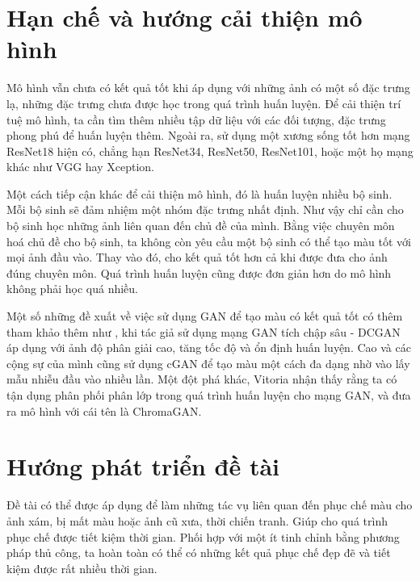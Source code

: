 \documentclass[a4paper, 12pt]{report}
\begin{document}
\section{Hạn chế và hướng cải thiện mô hình}\label{enhancemodel}

Mô hình vẫn chưa có kết quả tốt khi áp dụng với những ảnh có một số đặc trưng lạ, những đặc trưng chưa được học trong quá trình huấn luyện.
Để cải thiện trí tuệ mô hình, ta cần tìm thêm nhiều tập dữ liệu với các đối tượng, đặc trưng phong phú để huấn luyện thêm.
Ngoài ra, sử dụng một xương sống tốt hơn mạng ResNet18 hiện có, chẳng hạn ResNet34, ResNet50, ResNet101, hoặc một họ mạng khác như VGG hay Xception.\vspace{5pt}

Một cách tiếp cận khác để cải thiện mô hình, đó là huấn luyện nhiều bộ sinh.
Mỗi bộ sinh sẽ đảm nhiệm một nhóm đặc trưng nhất định.
Như vậy chỉ cần cho bộ sinh học những ảnh liên quan đến chủ đề của mình.
Bằng việc chuyên môn hoá chủ đề cho bộ sinh, ta không còn yêu cầu một bộ sinh có thể tạo màu tốt với mọi ảnh đầu vào.
Thay vào đó, cho kết quả tốt hơn cả khi được đưa cho ảnh đúng chuyên môn.
Quá trình huấn luyện cũng được đơn giản hơn do mô hình không phải học quá nhiều.\vspace{5pt}

Một số những đề xuất về việc sử dụng GAN để tạo màu có kết quả tốt có thêm tham khảo thêm như \cite{Nazeri_2018}, khi tác giả sử dụng mạng GAN tích chập sâu - DCGAN áp dụng với ảnh độ phân giải cao, tăng tốc độ và ổn định huấn luyện.
Cao và các cộng sự của mình \cite{cao2017unsupervised} cũng sử dụng cGAN để tạo màu một cách đa dạng nhờ vào lấy mẫu nhiễu đầu vào nhiều lần.
Một đột phá khác, Vitoria \cite{vitoria2020chromagan} nhận thấy rằng ta có tận dụng phân phối phân lớp trong quá trình huấn luyện cho mạng GAN, và đưa ra mô hình với cái tên là ChromaGAN.

\section{Hướng phát triển đề tài}

Đề tài có thể được áp dụng để làm những tác vụ liên quan đến phục chế màu cho ảnh xám, bị mất màu hoặc ảnh cũ xưa, thời chiến tranh.
Giúp cho quá trình phục chế được tiết kiệm thời gian.
Phối hợp với một ít tinh chỉnh bằng phương pháp thủ công, ta hoàn toàn có thể có những kết quả phục chế đẹp đẽ và tiết kiệm được rất nhiều thời gian.\vspace{5pt}
\end{document}
